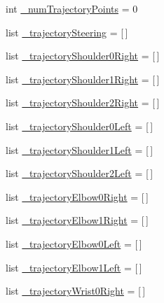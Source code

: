 \begin{DoxyCompactItemize}
int \mbox{\hyperlink{namespaceinterpolate__multiple__steering_ad8ba90d9a259eed607a17511f10d0b51}{\+\_\+num\+Trajectory\+Points}} = 0
\item 
list \mbox{\hyperlink{namespaceinterpolate__multiple__steering_a007775194afb695c175bdbe55caeb314}{\+\_\+trajectory\+Steering}} = \mbox{[}$\,$\mbox{]}
\item 
list \mbox{\hyperlink{namespaceinterpolate__multiple__steering_a155af98f91aa4d53d06883d691f962e7}{\+\_\+trajectory\+Shoulder0\+Right}} = \mbox{[}$\,$\mbox{]}
\item 
list \mbox{\hyperlink{namespaceinterpolate__multiple__steering_a82e02ef784b792acf6c8acc68d9151db}{\+\_\+trajectory\+Shoulder1\+Right}} = \mbox{[}$\,$\mbox{]}
\item 
list \mbox{\hyperlink{namespaceinterpolate__multiple__steering_a6e63926aed61cf0ed082f41582289f8f}{\+\_\+trajectory\+Shoulder2\+Right}} = \mbox{[}$\,$\mbox{]}
\item 
list \mbox{\hyperlink{namespaceinterpolate__multiple__steering_a58ba59ad0cd035255b5b88e7c3d6d92c}{\+\_\+trajectory\+Shoulder0\+Left}} = \mbox{[}$\,$\mbox{]}
\item 
list \mbox{\hyperlink{namespaceinterpolate__multiple__steering_a45e24d81020a717370a42c95b279dd88}{\+\_\+trajectory\+Shoulder1\+Left}} = \mbox{[}$\,$\mbox{]}
\item 
list \mbox{\hyperlink{namespaceinterpolate__multiple__steering_a364ff96aef87708264c595581bf7f017}{\+\_\+trajectory\+Shoulder2\+Left}} = \mbox{[}$\,$\mbox{]}
\item 
list \mbox{\hyperlink{namespaceinterpolate__multiple__steering_a4193a32f2702ab680d7ba1a7e85e8ae0}{\+\_\+trajectory\+Elbow0\+Right}} = \mbox{[}$\,$\mbox{]}
\item 
list \mbox{\hyperlink{namespaceinterpolate__multiple__steering_a093b5560946e65a16193a05a21b7f0f3}{\+\_\+trajectory\+Elbow1\+Right}} = \mbox{[}$\,$\mbox{]}
\item 
list \mbox{\hyperlink{namespaceinterpolate__multiple__steering_a71465b9c4421f9413ef7f86f455b0b68}{\+\_\+trajectory\+Elbow0\+Left}} = \mbox{[}$\,$\mbox{]}
\item 
list \mbox{\hyperlink{namespaceinterpolate__multiple__steering_a1ca55973d461db7bc7384277eb2a6d5c}{\+\_\+trajectory\+Elbow1\+Left}} = \mbox{[}$\,$\mbox{]}
\item 
list \mbox{\hyperlink{namespaceinterpolate__multiple__steering_a684019a37d2d1943f09bb8122f51f325}{\+\_\+trajectory\+Wrist0\+Right}} = \mbox{[}$\,$\mbox{]}
\item 

\end{DoxyCompactItemize}
